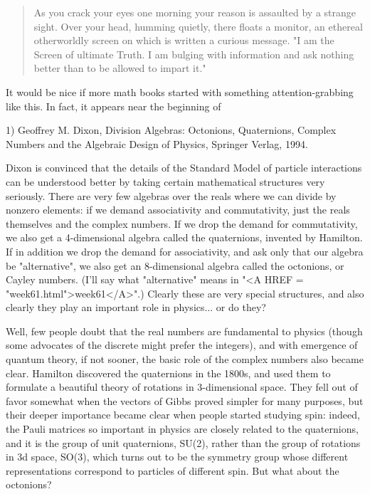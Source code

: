 

\begin{quote}
   As you crack your eyes one morning your reason is assaulted by
   a strange sight.  Over your head, humming quietly, there floats
   a monitor, an ethereal otherworldly screen on which is written a
   curious message.  "I am the Screen of ultimate Truth.  I am bulging
   with information and ask nothing better than to be allowed to impart
   it."
\end{quote}
    

It would be nice if more math books started with something
attention-grabbing like this.  In fact, it appears near the beginning
of

1) Geoffrey M. Dixon, Division Algebras: Octonions, Quaternions,
Complex Numbers and the Algebraic Design of Physics, Springer Verlag,
1994.


Dixon is convinced that the details of the Standard Model of particle
interactions can be understood better by taking certain mathematical
structures very seriously.  There are very few algebras over the reals
where we can divide by nonzero elements: if we demand associativity
and commutativity, just the reals themselves and the complex numbers.
If we drop the demand for commutativity, we also get a 4-dimensional
algebra called the quaternions, invented by Hamilton.  If in addition
we drop the demand for associativity, and ask only that our algebra be
"alternative", we also get an 8-dimensional algebra called the
octonions, or Cayley numbers.  (I'll say what "alternative" means in
"<A HREF = "week61.html">week61</A>".)  Clearly these are very special
structures, and also clearly they play an important role in
physics... or do they?

Well, few people doubt that the real numbers are fundamental 
to physics (though some advocates of the discrete 
might prefer the integers), and with emergence of quantum 
theory, if not sooner, the basic role of the complex 
numbers also became clear.  Hamilton discovered the quaternions
in the 1800s, and used them to formulate
a beautiful theory of rotations in 3-dimensional space.  They
fell out of favor somewhat when the vectors of Gibbs proved
simpler for many purposes, but their deeper importance became
clear when people started studying spin: indeed,
the Pauli matrices so important in physics are closely related
to the quaternions, and it is the group of unit quaternions, SU(2), 
rather than the group of rotations in 3d space, SO(3), which
turns out to be the symmetry group whose different representations 
correspond to particles of different spin.  But what about the
octonions?  

